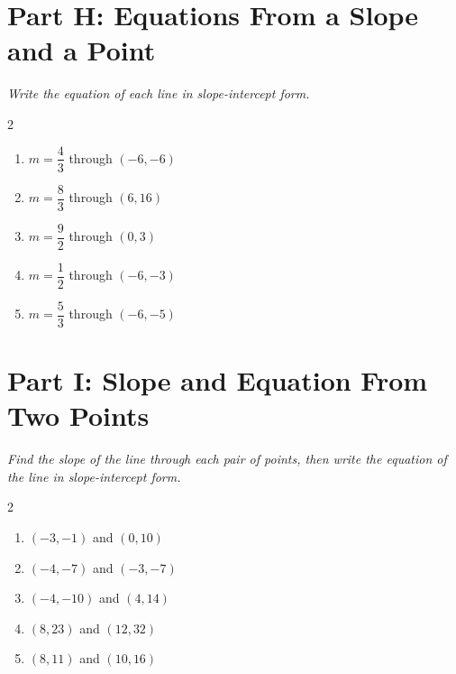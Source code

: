 \documentclass[11pt]{article}
\begin{document}
\section*{Part H: Equations From a Slope and a Point}
\noindent\textit{Write the equation of each line in slope-intercept form.}
\begin{multicols}{2}
\begin{enumerate}
  \item $m = \dfrac{4}{3}$ through $(-6, -6)$
  \vspace{2.0cm}
  \item $m = \dfrac{8}{3}$ through $(6, 16)$
  \vspace{2.0cm}
  \item $m = \dfrac{9}{2}$ through $(0, 3)$
  \vspace{2.0cm}
  \item $m = \dfrac{1}{2}$ through $(-6, -3)$
  \vspace{2.0cm}
  \item $m = \dfrac{5}{3}$ through $(-6, -5)$
  \vspace{2.0cm}
\end{enumerate}
\end{multicols}

\section*{Part I: Slope and Equation From Two Points}
\noindent\textit{Find the slope of the line through each pair of points, then write the equation of the line in slope-intercept form.}
\begin{multicols}{2}
\begin{enumerate}
  \item $(-3, -1)$ and $(0, 10)$
  \vspace{2.0cm}
  \item $(-4, -7)$ and $(-3, -7)$
  \vspace{2.0cm}
  \item $(-4, -10)$ and $(4, 14)$
  \vspace{2.0cm}
  \item $(8, 23)$ and $(12, 32)$
  \vspace{2.0cm}
  \item $(8, 11)$ and $(10, 16)$
  \vspace{2.0cm}
\end{enumerate}
\end{multicols}
\end{document}
